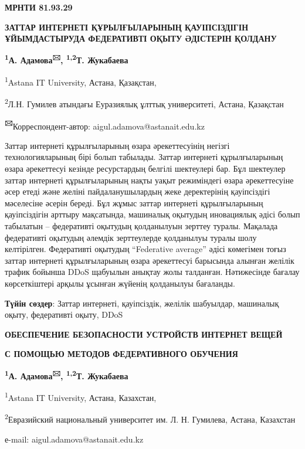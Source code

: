 
\newpage
{\bfseries МРНТИ 81.93.29}

{\bfseries ЗАТТАР ИНТЕРНЕТІ ҚҰРЫЛҒЫЛАРЫНЫҢ ҚАУІПСІЗДІГІН ҰЙЫМДАСТЫРУДА
ФЕДЕРАТИВТІ ОҚЫТУ ӘДІСТЕРІН ҚОЛДАНУ}

{\bfseries \textsuperscript{1}А. Адамова\textsuperscript{🖂},
\textsuperscript{1,2}Т. Жукабаева}

\textsuperscript{1}Astana IT University, Астана, Қазақстан,

\textsuperscript{2}Л.Н. Гумилев атындағы Еуразиялық ұлттық университеті,
Астана, Қазақстан

{\bfseries \textsuperscript{🖂}}Корреспондент-автор:
aigul.adamova@astanait.edu.kz

Заттар интернеті құрылғыларының өзара әрекеттесуінің негізгі
технологияларының бірі болып табылады. Заттар интернеті құрылғыларының
өзара әрекеттесуі кезінде ресурстардың белгілі шектеулері бар. Бұл
шектеулер заттар интернеті құрылғыларының нақты уақыт режиміндегі өзара
әрекеттесуіне әсер етеді және желіні пайдаланушылардың жеке деректерінің
қауіпсіздігі мәселесіне әсерін береді. Бұл жұмыс заттар интернеті
құрылғыларының қауіпсіздігін арттыру мақсатында, машиналық оқытудың
иновациялық әдісі болып табылатын -- федеративті оқытудың қолданылуын
зерттеу туралы. Мақалада федеративті оқытудың әлемдік зерттеулерде
қолданылуы туралы шолу келтірілген. Федеративті оқытудың ``Federative
average'' әдісі көмегімен тоғыз заттар интернеті құрылғыларының өзара
әрекеттесуі барысында алынған желілік трафик бойынша DDoS щабуылын
анықтау жолы талданған. Нәтижесінде бағалау көрсеткіштері арқылы ұсынған
жүйенің қолданылуы бағаланды.

{\bfseries Түйін сөздер}: Заттар интернеті, қауіпсіздік, желілік шабуылдар,
машиналық оқыту, федеративті оқыту, DDoS

{\bfseries ОБЕСПЕЧЕНИЕ БЕЗОПАСНОСТИ УСТРОЙСТВ ИНТЕРНЕТ ВЕЩЕЙ}

{\bfseries С ПОМОЩЬЮ МЕТОДОВ ФЕДЕРАТИВНОГО ОБУЧЕНИЯ}

{\bfseries \textsuperscript{1}А. Адамова\textsuperscript{🖂},
\textsuperscript{1,2}Т. Жукабаева}

\textsuperscript{1}Astana IT University, Астана, Казахстан,

\textsuperscript{2}Евразийский национальный университет им. Л. Н.
Гумилева, Астана, Казахстан

е-mail: aigul.adamova@astanait.edu.kz

